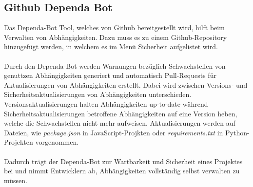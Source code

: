 \subsection{Github Dependa Bot} \label{sec:Dependa}
Das Dependa-Bot Tool, welches von Github bereitgestellt wird, hilft beim Verwalten von Abhängigkeiten.
Dazu muss es zu einem Github-Repository hinzugefügt werden, in welchem es im Menü Sicherheit aufgelistet wird.
\\ \\
Durch den Dependa-Bot werden Warnungen bezüglich Schwachstellen von genuttzen Abhängigkeiten generiert und automatisch Pull-Requests für Aktualisierungen von Abhängigkeiten erstellt.
Dabei wird zwischen Versions- und Sicherheitsaktualisierungen von Abhängigkeiten unterschieden.
Versionsaktualisierungen halten Abhängigkeiten up-to-date während Sicherheitsaktualisierungen betroffene Abhängigkeiten auf eine Version heben, welche die Schwachstellen nicht mehr aufweisen.
Aktualisierungen werden auf Dateien, wie \textit{package.json} in JavaScript-Projkten oder \textit{requirements.txt} in Python-Projekten vorgenommen.
\\ \\
Dadurch trägt der Dependa-Bot zur Wartbarkeit und Sicherheit eines Projektes bei und nimmt Entwicklern ab, Abhängigkeiten vollständig selbst verwalten zu müssen.